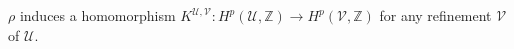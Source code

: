 
$\rho$ induces a homomorphism $K^{\mathcal{U}, \mathcal{V}} : H^p(\mathcal{U}, \mathbb{Z}) \rightarrow H^p(\mathcal{V}, \mathbb{Z})$ for any refinement $\mathcal{V}$ of $\mathcal{U}$.
